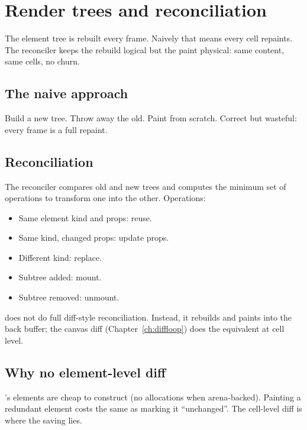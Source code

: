 \chapter{Render trees and reconciliation}
\label{ch:reconcile}

\begin{aside}
The element tree is rebuilt every frame. Naively that means
every cell repaints. The reconciler keeps the rebuild logical
but the paint physical: same content, same cells, no churn.
\end{aside}

\section{The naive approach}

Build a new tree. Throw away the old. Paint from scratch.
Correct but wasteful: every frame is a full repaint.

\section{Reconciliation}

The reconciler compares old and new trees and computes the
minimum set of operations to transform one into the other.
Operations:

\begin{itemize}[leftmargin=*]
  \item Same element kind and props: reuse.
  \item Same kind, changed props: update props.
  \item Different kind: replace.
  \item Subtree added: mount.
  \item Subtree removed: unmount.
\end{itemize}

\maya{} does not do full diff-style reconciliation. Instead,
it rebuilds and paints into the back buffer; the canvas diff
(Chapter~\ref{ch:diffloop}) does the equivalent at cell level.

\section{Why no element-level diff}

\maya{}'s elements are cheap to construct (no allocations
when arena-backed). Painting a redundant element costs the
same as marking it ``unchanged''. The cell-level diff is
where the saving lies.

